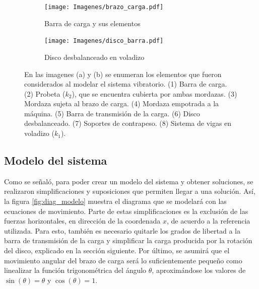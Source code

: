\begin{figure}[p]
\centering
	\begin{subfigure}{1\linewidth}
		\centering
		\texttt{[image: Imagenes/brazo\_carga.pdf]}
		\caption{Barra de carga y sus elementos}\label{fig:elementos_brazo}
	\end{subfigure}
	\begin{subfigure}{1\linewidth}
		\centering
		\texttt{[image: Imagenes/disco\_barra.pdf]}
		\caption{Disco desbalanceado en voladizo}\label{fig:elementos_disco}
	\end{subfigure}
\caption{En las imagenes (a) y (b) se enumeran los elementos que fueron considerados al modelar el sistema vibratorio. (1) Barra de carga. (2) Probeta ($k_2$), que se encuentra cubierta por ambas mordazas. (3) Mordaza sujeta al brazo de carga. (4) Mordaza empotrada a la máquina. (5) Barra de transmisión de la carga. (6) Disco desbalanceado. (7) Soportes de contrapeso. (8) Sistema de vigas en voladizo ($k_1$).}
\label{fig:elementos_modelo}
\end{figure}

\subsection{Modelo del sistema}
\label{sec:mod_sist}
Como se señaló, para poder crear un modelo del sistema y obtener soluciones, se realizaron simplificaciones y suposiciones que permiten llegar a una solución. Así, la figura \ref{fig:diag_modelo} muestra el diagrama que se modelará con las ecuaciones de movimiento. Parte de estas simplificaciones es la exclusión de las fuerzas horizontales, en dirección de la coordenada $x$, de acuerdo a la referencia utilizada. Para esto, también es necesario quitarle los grados de libertad a la barra de transmisión de la carga y simplificar la carga producida por la rotación del disco, explicado en la sección siguiente. Por último, se asumirá que el movimiento angular del brazo de carga será lo suficientemente pequeño como linealizar la función trigonométrica del ángulo $\theta$, aproximándose los valores de $\sin(\theta) = \theta$ y $\cos(\theta)=1$.

